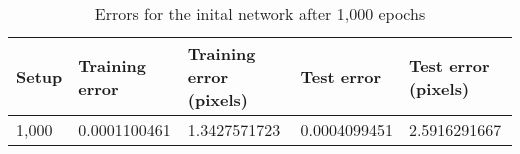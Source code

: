 \begin{table}[h!]
\centering
\footnotesize
\begin{tabular}{|l|l|l|l|l|}
	\hline
		\textbf{Setup} & \textbf{Training error} & \textbf{Training error (pixels)} & \textbf{Test error} & \textbf{Test error (pixels)}\\
	\hline
		1,000	& 0.0001100461%
				& 1.3427571723%
				& 0.0004099451%
				& 2.5916291667%
				\\
	\hline
	\end{tabular}
	\normalsize
	\caption{Errors for the inital network after 1,000 epochs}
	\label{tab:gabor_errors_initial_network}
\end{table}
